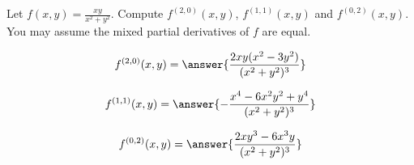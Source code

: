 \documentclass{ximera}
\author{David Guichard \and Neal Koblitz \and H. Jerome Keisler \and Albert Scheller \and Barry Balof \and Mike Wills \and Matthew Carr}
\begin{document}
\begin{exercise}




Let $f(x,y)=\frac{xy}{x^2+y^2}$. Compute $f^{(2,0)}(x,y)$, $f^{(1,1)}(x,y)$ and $f^{(0,2)}(x,y)$. You may assume the mixed partial derivatives of $f$ are equal.
\begin{prompt}
\[
f^{(2,0)}(x,y)=\answer{\frac{2 x y (x^2-3 y^2)}{(x^2+y^2)^3}}
\]
\end{prompt}
\begin{prompt}
\[
f^{(1,1)}(x,y)=\answer{-\frac{x^4-6 x^2 y^2+y^4}{(x^2+y^2)^3}}
\]
\end{prompt}
\begin{prompt}
\[
f^{(0,2)}(x,y)=\answer{\frac{2 x y^3-6 x^3 y}{(x^2+y^2)^3}}
\]
\end{prompt}

\end{exercise}
\end{document}
